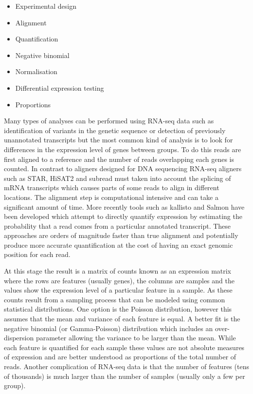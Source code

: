 \documentclass[11pt,a4paper,titlepage,twoside,openright]{style/unimelbthesis}
\theoremstyle{definition}
\theoremstyle{definition}
\theoremstyle{definition}
\theoremstyle{remark}
\begin{document}
\begin{mainmatter}
\begin{itemize}
\tightlist
\item
  Experimental design
\item
  Alignment
\item
  Quantification
\item
  Negative binomial
\item
  Normalisation
\item
  Differential expression testing
\item
  Proportions
\end{itemize}

Many types of analyses can be performed using RNA-seq data such as identification of variants in the genetic sequence or detection of previously unannotated transcripts but the most common kind of analysis is to look for differences in the expression level of genes between groups. To do this reads are first aligned to a reference and the number of reads overlapping each genes is counted. In contrast to aligners designed for DNA sequencing RNA-seq aligners such as STAR, HiSAT2 and subread must taken into account the splicing of mRNA transcripts which causes parts of some reads to align in different locations. The alignment step is computational intensive and can take a significant amount of time. More recently tools such as kallisto and Salmon have been developed which attempt to directly quantify expression by estimating the probability that a read comes from a particular annotated transcript. These approaches are orders of magnitude faster than true alignment and potentially produce more accurate quantification at the cost of having an exact genomic position for each read.

At this stage the result is a matrix of counts known as an expression matrix where the rows are features (usually genes), the columns are samples and the values show the expression level of a particular feature in a sample. As these counts result from a sampling process that can be modeled using common statistical distributions. One option is the Poisson distribution, however this assumes that the mean and variance of each feature is equal. A better fit is the negative binomial (or Gamma-Poisson) distribution which includes an over-dispersion parameter allowing the variance to be larger than the mean. While each feature is quantified for each sample these values are not absolute measures of expression and are better understood as proportions of the total number of reads. Another complication of RNA-seq data is that the number of features (tens of thousands) is much larger than the number of samples (usually only a few per group).


\end{mainmatter}
\end{document}
